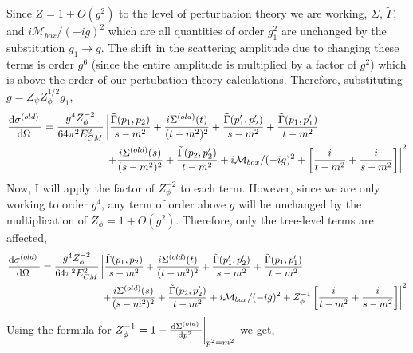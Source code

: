 \documentclass{article}
\begin{document}
Since $Z = 1 + O(g^2)$ to the level of perturbation theory we are working, $\Sigma$, $\tilde{\Gamma}$, and $i\mathcal{M}_{box}/(-ig)^2$ which are all quantities of order $g_1^2$ are unchanged by the substitution $g_1 \to g$. The shift in the scattering amplitude due to changing these terms is order $g^6$ (since the entire amplitude is multiplied by a factor of $g^2$) which is above the order of our pertubation theory calculations. Therefore, substituting $g = Z_\psi Z_\phi^{1/2} g_1$,
\begin{align*}
\frac{\mathrm{d}\sigma^{(old)} \:}{\mathrm{d}\Omega \:} &= \frac{g^4 Z_\phi^{-2}}{64 \pi^2 E_{CM}^2} \left|  \frac{ \tilde{\Gamma}(p_1, p_2)}{s  - m^2} + \frac{i \Sigma^{(old)}(t)}{(t - m^2)^2} + \frac{\tilde{\Gamma}(p_1', p_2')}{s - m^2} 
+  \frac{\tilde{\Gamma}(p_1, p_1')}{t - m^2} \right.
\\ 
& \left.
\quad \quad \quad \quad \quad \quad 
+ \frac{i \Sigma^{(old)}(s)}{(s - m^2)^2} + \frac{\tilde{\Gamma}(p_2, p_2')}{t - m^2} + i\mathcal{M}_{box}/(-ig)^2 + \left[\frac{i}{t - m^2 } + \frac{i}{s - m^2 }\right] \right|^2 
\end{align*}  
Now, I will apply the factor of $Z_\phi^{-2}$ to each term. However, since we are only working to order $g^4$, any term of order above $g$ will be unchanged by the multiplication of $Z_\phi = 1 + O(g^2)$. Therefore, only the tree-level terms are affected,
\begin{align*}
\frac{\mathrm{d}\sigma^{(old)} \:}{\mathrm{d}\Omega \:} &= \frac{g^4 Z_\phi^{-2}}{64 \pi^2 E_{CM}^2} \left|  \frac{ \tilde{\Gamma}(p_1, p_2)}{s  - m^2} + \frac{i \Sigma^{(old)}(t)}{(t - m^2)^2} + \frac{\tilde{\Gamma}(p_1', p_2')}{s - m^2} 
+  \frac{\tilde{\Gamma}(p_1, p_1')}{t - m^2} \right.
\\ 
& \left.
\quad \quad \quad \quad \quad \quad 
+ \frac{i \Sigma^{(old)}(s)}{(s - m^2)^2} + \frac{\tilde{\Gamma}(p_2, p_2')}{t - m^2} + i\mathcal{M}_{box}/(-ig)^2 + Z_\phi^{-1} \left[\frac{i}{t - m^2 } + \frac{i}{s - m^2 }\right] \right|^2 
\end{align*}  
Using the formula for $Z_\phi^{-1} = 1 - \frac{\mathrm{d}\Sigma^{(old)} \:}{\mathrm{d}p^2 \:} \bigg|_{p^2 = m^2}$ we get,
\end{document}
